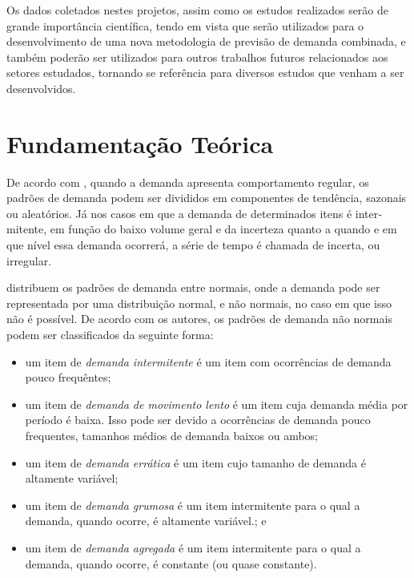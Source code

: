 \documentclass[11pt,letterpaper,twocolumn]{article}
\begin{document}
Os dados coletados nestes projetos, assim como os estudos realizados serão de grande importância científica, tendo em vista que serão utilizados para o desenvolvimento de uma nova metodologia de previsão de demanda combinada, e também poderão ser utilizados para outros trabalhos futuros relacionados aos setores estudados, tornando se referência para diversos estudos que venham a ser desenvolvidos.

\section{Fundamentação Teórica}


De acordo com \cite{Ballou2006}, quando a demanda apresenta comportamento regular, os padrões de demanda podem ser divididos em compo­nentes de tendência, sazonais ou aleatórios. Já nos casos em que a demanda de determinados itens é inter­mitente, em função do baixo volume geral e da incerte­za quanto a quando e em que nível essa demanda ocor­rerá, a série de tempo é chamada de incerta, ou irregu­lar.

\cite{BoylanEtAl2008} distribuem os padrões de demanda entre normais, onde a demanda pode ser representada por uma distribuição normal, e não normais, no caso em que isso não é possível. De acordo com os autores, os padrões de demanda não normais podem ser classificados da seguinte forma:

\begin{itemize}
  \item um item de \emph{demanda intermitente} é um item com ocorrências de demanda pouco frequêntes;
  \item um item de \emph{demanda de movimento lento} é um item cuja demanda média por período é baixa. Isso pode ser devido a ocorrências de demanda pouco frequentes, tamanhos médios de demanda baixos ou ambos;
  \item um item de \emph{demanda errática} é um item cujo tamanho de demanda é altamente variável;
  \item um item de \emph{demanda grumosa} é um item intermitente para o qual a demanda, quando ocorre, é altamente variável.; e
  \item um item de \emph{demanda agregada} é um item intermitente para o qual a demanda, quando ocorre, é constante (ou quase constante).
\end{itemize}
\end{document}
